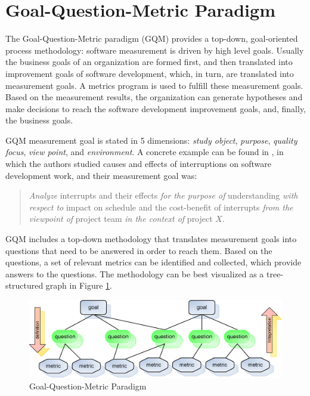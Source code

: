 \section{Goal-Question-Metric Paradigm} \label{RelatedWork:GQM}

The Goal-Question-Metric paradigm (GQM) \cite{Basili:1988, Basili:1992} provides a top-down, goal-oriented process methodology: software measurement is driven by high level goals. Usually the business goals of an organization are formed first, and then translated into improvement goals of software development, which, in turn, are translated into measurement goals. A metrics program is used to fulfill these measurement goals. Based on the measurement results, the organization can generate hypotheses and make decisions to reach the software development improvement goals, and, finally, the business goals.

GQM measurement goal is stated in 5 dimensions: \textit{study object}, \textit{purpose}, \textit{quality focus}, \textit{view point}, and \textit{environment}. A concrete example can be found in \cite{Solingen:1998, Solingen:1999}, in which the authors studied causes and effects of interruptions on software development work, and their measurement goal was:

\begin{quote}	
 \textit{Analyze} interrupts and their effects \textit{for the purpose of} understanding \textit{with respect to} impact on schedule and the cost-benefit of interrupts \textit{from the viewpoint of} project team \textit{in the context of} project $X$.
\end{quote}

GQM includes a top-down methodology that translates measurement goals into questions that need to be answered in order to reach them. Based on the questions, a set of relevant metrics can be identified and collected, which provide answers to the questions. The methodology can be best visualized as a tree-structured graph in Figure \ref{fig:gqm}.

\begin{figure}[tbp]
	\centering
		\includegraphics[width=1.00\textwidth]{figures/GQM}
		\caption{Goal-Question-Metric Paradigm}
	\label{fig:gqm}
\end{figure}


